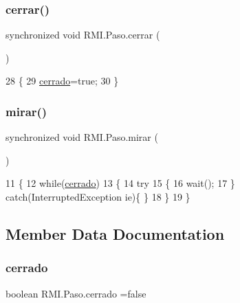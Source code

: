\subsubsection{\texorpdfstring{cerrar()}{cerrar()}}
{\footnotesize\ttfamily synchronized void R\+M\+I.\+Paso.\+cerrar (\begin{DoxyParamCaption}{ }\end{DoxyParamCaption})\hspace{0.3cm}{\ttfamily [inline]}}


\begin{DoxyCode}
28     \{
29         \mbox{\hyperlink{class_r_m_i_1_1_paso_acf12d24b9ce56005480644624d042067}{cerrado}}=\textcolor{keyword}{true};
30     \}
\end{DoxyCode}
\mbox{\label{class_r_m_i_1_1_paso_a988694346834bbf37f12e3ea425a277c}} 
\subsubsection{\texorpdfstring{mirar()}{mirar()}}
{\footnotesize\ttfamily synchronized void R\+M\+I.\+Paso.\+mirar (\begin{DoxyParamCaption}{ }\end{DoxyParamCaption})\hspace{0.3cm}{\ttfamily [inline]}}


\begin{DoxyCode}
11     \{
12         \textcolor{keywordflow}{while}(\mbox{\hyperlink{class_r_m_i_1_1_paso_acf12d24b9ce56005480644624d042067}{cerrado}})
13         \{
14             \textcolor{keywordflow}{try}
15             \{
16                 wait();
17             \} \textcolor{keywordflow}{catch}(InterruptedException ie)\{ \}
18         \}
19     \}
\end{DoxyCode}


\subsection{Member Data Documentation}
\mbox{\label{class_r_m_i_1_1_paso_acf12d24b9ce56005480644624d042067}} 
\subsubsection{\texorpdfstring{cerrado}{cerrado}}
{\footnotesize\ttfamily boolean R\+M\+I.\+Paso.\+cerrado =false\hspace{0.3cm}{\ttfamily [private]}}

